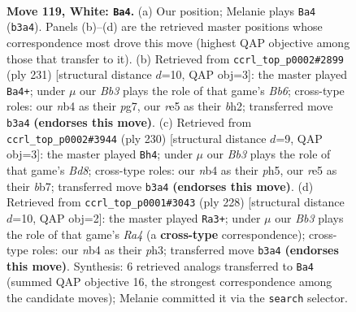 \documentclass[11pt]{article}
\begin{document}
\clearpage

\begin{figure}[p]\centering
\begin{subfigure}{0.46\textwidth}\centering
\resizebox{\linewidth}{!}{%
\newchessgame
\chessboard[
  setfen={8/8/6k1/4r1p1/1n6/1B4K1/8/8 w - - 22 119},
  showmover=false,
  pgfstyle=straightmove, color=movearrow, markmove={b3-a4}
]}
\caption{}
\end{subfigure}\hfill
\begin{subfigure}{0.46\textwidth}\centering
\resizebox{\linewidth}{!}{%
\newchessgame
\chessboard[
  setfen={3k4/6P1/2KP4/8/8/1b6/7B/8 b - - 16 116},
  showmover=false,
  pgfstyle=straightmove, color=movearrow, markmove={b3-a4}
]}
\caption{}
\end{subfigure}
\\[4pt]
\begin{subfigure}{0.46\textwidth}\centering
\resizebox{\linewidth}{!}{%
\newchessgame
\chessboard[
  setfen={3B4/1b6/8/5k1p/5p2/8/5K2/8 w - - 78 116},
  showmover=false,
  pgfstyle=straightmove, color=movearrow, markmove={d8-h4}
]}
\caption{}
\end{subfigure}\hfill
\begin{subfigure}{0.46\textwidth}\centering
\resizebox{\linewidth}{!}{%
\newchessgame
\chessboard[
  setfen={8/8/7r/8/R7/4kp1p/7K/8 w - - 6 115},
  showmover=false,
  pgfstyle=straightmove, color=movearrow, markmove={a4-a3}
]}
\caption{}
\end{subfigure}
\caption{\textbf{Move 119, White: \texttt{Ba4}.} (a) Our position; Melanie plays \texttt{Ba4} (\texttt{b3a4}). Panels (b)--(d) are the retrieved master positions whose correspondence most drove this move (highest QAP objective among those that transfer to it). (b) Retrieved from \texttt{ccrl\_top\_p0002\#2899} (ply 231) [structural distance $d$=10, QAP obj=3]: the master played \texttt{Ba4+}; under $\mu$ our \emph{Bb3} plays the role of that game's \emph{Bb6}; cross-type roles: our \emph{n}b4 as their \emph{p}g7, our \emph{r}e5 as their \emph{b}h2; transferred move \texttt{b3a4} \textbf{(endorses this move)}. (c) Retrieved from \texttt{ccrl\_top\_p0002\#3944} (ply 230) [structural distance $d$=9, QAP obj=3]: the master played \texttt{Bh4}; under $\mu$ our \emph{Bb3} plays the role of that game's \emph{Bd8}; cross-type roles: our \emph{n}b4 as their \emph{p}h5, our \emph{r}e5 as their \emph{b}b7; transferred move \texttt{b3a4} \textbf{(endorses this move)}. (d) Retrieved from \texttt{ccrl\_top\_p0001\#3043} (ply 228) [structural distance $d$=10, QAP obj=2]: the master played \texttt{Ra3+}; under $\mu$ our \emph{Bb3} plays the role of that game's \emph{Ra4} (a \textbf{cross-type} correspondence); cross-type roles: our \emph{n}b4 as their \emph{p}h3; transferred move \texttt{b3a4} \textbf{(endorses this move)}. Synthesis: 6 retrieved analogs transferred to \texttt{Ba4} (summed QAP objective 16, the strongest correspondence among the candidate moves); Melanie committed it via the \texttt{search} selector.}
\label{fig:thought-m236}
\end{figure}
\end{document}
